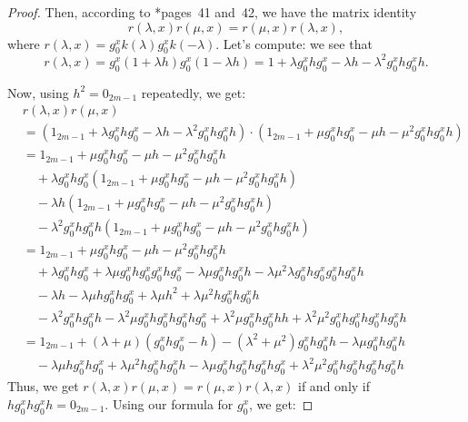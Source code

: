 \documentclass[a4paper,11pt]{amsproc}
\theoremstyle{plain}
\theoremstyle{definition}
\begin{document}
\begin{proof}
		Then, according to \cite{tomanov1985generalized}*{pages~41 and~42}, we have the matrix identity
		$$
		r(\lambda,x)r(\mu,x)=r(\mu,x)r(\lambda,x),
		$$
		where $r(\lambda,x)=g_0^xk(\lambda)g_0^x k(-\lambda)$. Let's compute: we see that
		$$
		r(\lambda,x)= g_0^x (1+\lambda h)g_0^x (1-\lambda h) = 1 + \lambda g_0^x h g_0^x - \lambda h -\lambda^2 g_0^x h g_0^x h.
		$$
		
		Now, using $h^2=0_{2m-1}$ repeatedly, we get:
		\begin{align*}
			& r(\lambda,x)r(\mu,x)\\
			& = (1_{2m-1} + \lambda g_0^x h g_0^x -\lambda h - \lambda^2 g_0^x h g_0^x h) \cdot (1_{2m-1} + \mu g_0^x h g_0^x -\mu h - \mu^2 g_0^x h g_0^x h) \\
			& = 1_{2m-1} + \mu g_0^x h g_0^x -\mu h- \mu^2 g_0^x h g_0^x h \\
			&\quad + \lambda g_0^x h g_0^x(1_{2m-1} + \mu g_0^x h g_0^x -\mu h- \mu^2 g_0^x h g_0^x h) \\
			&\quad -\lambda h(1_{2m-1} + \mu g_0^x h g_0^x -\mu h - \mu^2 g_0^x h g_0^x h)\\
			&\quad - \lambda^2 g_0^x h g_0^x h(1_{2m-1} + \mu g_0^x h g_0^x - \mu h- \mu^2 g_0^x h g_0^x h)\\
			& = 1_{2m-1} + \mu g_0^x h g_0^x -\mu h - \mu^2 g_0^x h g_0^x h \\
			&\quad + \lambda g_0^x h g_0^x +  \lambda\mu g_0^x h g_0^x g_0^x h g_0^x -\lambda \mu g_0^x h g_0^xh - \lambda\mu^2 \lambda g_0^x h g_0^x g_0^x h g_0^x h\\
			&\quad -\lambda h - \lambda\mu h g_0^x h g_0^x + \lambda\mu h^2+ \lambda\mu^2 h g_0^x h g_0^x h\\
			&\quad - \lambda^2 g_0^x h g_0^x h - \lambda^2\mu g_0^x h g_0^x h g_0^x h g_0^x + \lambda^2\mu g_0^x h g_0^x hh +  \lambda^2\mu^2 g_0^x h g_0^x h g_0^x h g_0^x h\\
			& = 1_{2m-1} +(\lambda+\mu)(g_0^x h g_0^x-h)   - (\lambda^2+\mu^2) g_0^x h g_0^x h -\lambda\mu g_0^x h g_0^x h\\  
			&\quad- \lambda\mu h g_0^x h g_0^x + \lambda \mu^2 h g_0^x h g_0^x h - \lambda\mu g_0^x h g_0^x h g_0^x h g_0^x + \lambda^2\mu^2 g_0^x h g_0^x h g_0^x h g_0^x h
		\end{align*}
		Thus, we get $r(\lambda,x)r(\mu,x)=r(\mu,x)r(\lambda,x)$ if and only if
		$h g_0^x h g_0^x h =0_{2m-1}.$ Using our formula for $g_0^x$, we get:
		

\end{proof}
\end{document}
